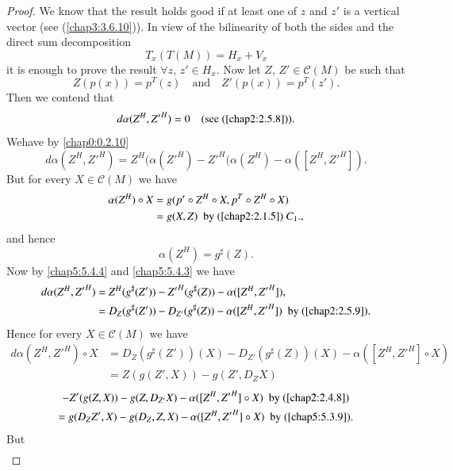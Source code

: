 \begin{proof}
We know that the result holds good if at least one of $z$ and $z'$ is
a vertical vector (see (\ref{chap3:3.6.10})). In view of the bilinearity
of both the sides and the direct sum decomposition 
$$
T_{x}(T(M))=H_{x}+V_{x}
$$
it is enough to prove the result $\forall z$, $z'\in H_{x}$. Now let
$Z$, $Z'\in \mathscr{C}(M)$ be such that 
\begin{equation*}
Z(p(x))=p^{T}(z)\quad\text{and}\quad
Z'(p(x))=p^{T}(z').\tag{5.4.2}\label{chap5:5.4.2} 
\end{equation*}
Then we contend that
$$
d\alpha (Z^{H},{Z'}^{H})=0\quad (\text{see (\ref{chap2:2.5.8})}).
$$
We\pageoriginale have by \eqref{chap0:0.2.10}
\begin{equation*}
d\alpha(Z^{H},{Z'}^{H})=Z^{H}(\alpha({Z'}^{H})-{Z'}^{H}(\alpha(Z^{H})-\alpha([Z^{H},{Z'}^{H}]).\tag{5.4.3}\label{chap5:5.4.3} 
\end{equation*}
But for every $X\in\mathscr{C}(M)$ we have
\begin{align*}
\alpha(Z^{H})\circ X &= g(p'\circ Z^{H}\circ X,p^{T}\circ Z^{H}\circ
X)\\
&= g(X,Z)\text{ \ by (\ref{chap2:2.1.5}) } C_{1}.,
\end{align*}
and hence
\begin{equation*}
\alpha(Z^{H})=g^{\sharp}(Z).\tag{5.4.4}\label{chap5:5.4.4}
\end{equation*}
Now by \eqref{chap5:5.4.4} and \eqref{chap5:5.4.3} we have
\begin{align*}
d\alpha (Z^{H},{Z'}^{H}) &=
Z^{H}(g^{\sharp}(Z'))-{Z'}^{H}(g^{\sharp}(Z))-\alpha([Z^{H},{Z'}^{H}]),\\
&=
D_{Z}(g^{\sharp}(Z'))-D_{Z'}(g^{\sharp}(Z))-\alpha([Z^{H},{Z'}^{H}])\text{
  \ by (\ref{chap2:2.5.9})}.
\end{align*}
Hence for every $X\in\mathscr{C}(M)$ we have
\begin{align*}
d\alpha(Z^{H},{Z'}^{H})\circ X &=
D_{Z}(g^{\sharp}(Z'))(X)-D_{Z'}(g^{\sharp}(Z))(X)-\alpha([Z^{H},{Z'}^{H}]\circ
X)\tag{5.4.5}\label{chap5:5.4.5}\\
&= Z(g(Z',X))-g(Z',D_{Z}X)
\end{align*}
\begin{gather*}
-Z'(g(Z,X))-g(Z,D_{Z'}X)-\alpha([Z^{H},{Z'}^{H}]\circ X)\text{ \ by
  (\ref{chap2:2.4.8})}\\
=g(D_{Z}Z',X)-g(D_{Z},Z,X)-\alpha([Z^{H},{Z'}^{H}]\circ X)\text{ \ by (\ref{chap5:5.3.9}).}
\end{gather*}
But
\begin{align*}

\end{align*}
\end{proof}
